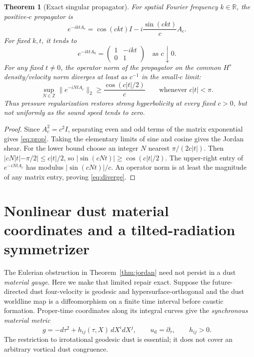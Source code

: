 \documentclass[11pt,a4paper]{article}
\newtheorem{theorem}{Theorem}
\newcommand{\R}{\mathbb R}
\newcommand{\Z}{\mathbb Z}
\begin{document}
\begin{theorem}[Exact singular propagator]
\label{thm:limit}
For spatial Fourier frequency $k\in\R$,
the positive-$c$ propagator is
\begin{equation}\label{eq:prop}
\boxed{\quad
e^{-iktA_c}=\cos(ckt)I
-i\frac{\sin(ckt)}{c}A_c.
\quad}
\end{equation}
For fixed $k,t$, it tends to
\[
e^{-iktA_0}=
\begin{pmatrix}1&-ikt\\0&1\end{pmatrix}
\quad\text{as }c\downarrow0.
\]
For any fixed $t\ne0$, the operator
norm of the propagator on the common
$H^s$ density/velocity norm
diverges at least as $c^{-1}$
in the small-$c$ limit:
\begin{equation}\label{eq:diverge}
\sup_{N\in\Z}\|e^{-iNtA_c}\|_2
\ge\frac{\cos(c|t|/2)}{c}
\qquad\text{whenever }c|t|<\pi.
\end{equation}
Thus pressure regularization restores
strong hyperbolicity at every fixed
$c>0$, but \emph{not uniformly}
as the sound speed tends to zero.
\end{theorem}
\begin{proof}
Since $A_c^2=c^2I$, separating even
and odd terms of the matrix exponential
gives \eqref{eq:prop}. Taking
the elementary limits of sine and cosine
gives the Jordan shear.
For the lower bound choose an integer
$N$ nearest $\pi/(2c|t|)$.
Then
$|cN|t|-\pi/2|\le c|t|/2$,
so $|\sin(cNt)|\ge\cos(c|t|/2)$.
The upper-right entry of
$e^{-iNtA_c}$ has modulus
$|\sin(cNt)|/c$. An operator
norm is at least the magnitude
of any matrix entry, proving
\eqref{eq:diverge}.
\end{proof}


\section{Nonlinear dust material coordinates and a tilted-radiation symmetrizer}
\label{sec:material}
The Eulerian obstruction in Theorem~\ref{thm:jordan}
need not persist in a dust \emph{material gauge}.
Here we make that limited repair exact.
Suppose the future-directed dust four-velocity
is geodesic and hypersurface-orthogonal and
the dust worldline map is a diffeomorphism on
a finite time interval before caustic formation.
Proper-time coordinates along its integral curves
give the \emph{synchronous material metric}
\begin{equation}\label{eq:materialmetric}
g=-d\tau^2+h_{ij}(\tau,X)\,dX^i dX^j,
\qquad u_{\mathrm d}=\partial_\tau,\qquad h_{ij}>0.
\end{equation}
The restriction to irrotational geodesic dust
is essential; it does not cover an arbitrary
vortical dust congruence.
\end{document}
